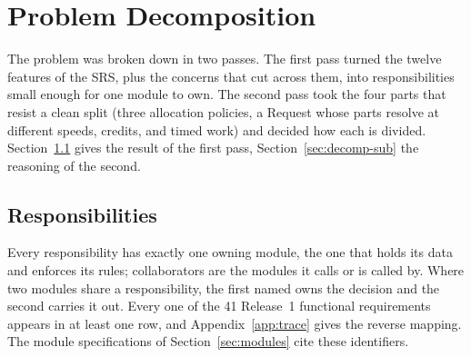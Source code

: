 \section{Problem Decomposition}\label{sec:decomp}

The problem was broken down in two passes. The first pass turned the twelve features of the SRS, plus the concerns that cut across them, into responsibilities small enough for one module to own. The second pass took the four parts that resist a clean split (three allocation policies, a Request whose parts resolve at different speeds, credits, and timed work) and decided how each is divided. Section~\ref{sec:decomp-resp} gives the result of the first pass, Section~\ref{sec:decomp-sub} the reasoning of the second.

\subsection{Responsibilities}\label{sec:decomp-resp}

Every responsibility has exactly one owning module, the one that holds its data and enforces its rules; collaborators are the modules it calls or is called by. Where two modules share a responsibility, the first named owns the decision and the second carries it out. Every one of the 41 Release~1 functional requirements appears in at least one row, and Appendix~\ref{app:trace} gives the reverse mapping. The module specifications of Section~\ref{sec:modules} cite these identifiers.

